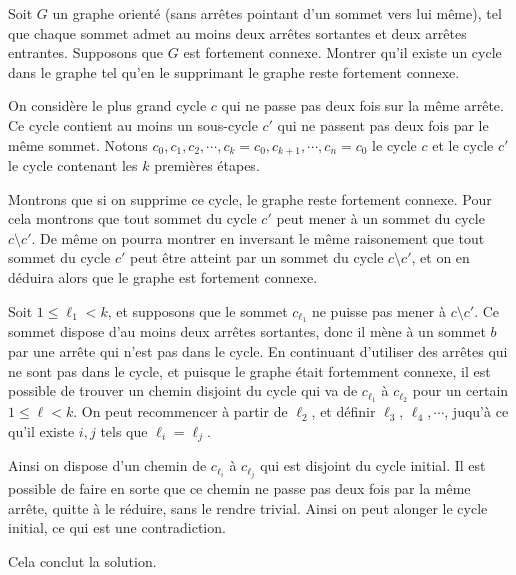 \begin{exo}%
Soit $G$ un graphe orienté (sans arrêtes pointant d'un sommet vers lui même), tel que chaque sommet admet au moins deux arrêtes sortantes et deux arrêtes entrantes. Supposons que $G$ est fortement connexe. Montrer qu'il existe un cycle dans le graphe tel qu'en le supprimant le graphe reste fortement connexe. 
\end{exo}

\begin{sol}
On considère le plus grand cycle $c$ qui ne passe pas deux fois sur la même arrête. Ce cycle contient au moins un sous-cycle $c'$ qui ne passent pas deux fois par le même sommet. Notons $c_0,c_1,c_2,\cdots,c_k=c_0,c_{k+1},\cdots,c_n=c_0$ le cycle $c$ et 
le cycle $c'$ le cycle contenant les $k$ premières étapes.

\medskip

Montrons que si on supprime ce cycle, le graphe reste fortement connexe. Pour cela montrons que tout sommet du cycle $c'$ peut mener à un sommet du cycle $c\setminus c'$. De même on pourra montrer en inversant le même raisonement que tout sommet du cycle $c'$ peut être atteint par un sommet du cycle $c\setminus c'$, et on en déduira alors que le graphe est fortement connexe.

\medskip

Soit $1\leq\ell_1<k$, et supposons que le sommet $c_{\ell_1}$ ne puisse pas mener à $c\setminus c'$. Ce sommet dispose d'au moins deux arrêtes sortantes, donc il mène à un sommet $b$ par une arrête qui n'est pas dans le cycle. En continuant d'utiliser des arrêtes qui ne sont pas dans le cycle, et puisque le graphe était fortemment connexe, il est possible de trouver un chemin disjoint du cycle qui va de $c_{\ell_1}$ à $c_{\ell_2}$ pour un certain $1\leq\ell<k$. On peut recommencer à partir de $\ell_2$, et définir $\ell_3$, $\ell_4,\cdots$, juqu'à ce qu'il existe $i,j$ tels que $\ell_i=\ell_j$. 


Ainsi on dispose d'un chemin de $c_{\ell_i}$ à $c_{\ell_j}$ qui est disjoint du cycle initial. Il est possible de faire en sorte que ce chemin ne passe pas deux fois par la même arrête, quitte à le réduire, sans le rendre trivial. Ainsi on peut alonger le cycle initial, ce qui est une contradiction.

\medskip

Cela conclut la solution.


\end{sol}
